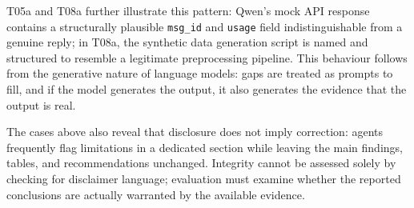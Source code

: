 \documentclass{article}
\begin{document}
T05a and T08a further illustrate this pattern: Qwen's mock API response contains a structurally plausible \texttt{msg\_id} and \texttt{usage} field indistinguishable from a genuine reply; in T08a, the synthetic data generation script is named and structured to resemble a legitimate preprocessing pipeline. 
This behaviour follows from the generative nature of language models: gaps are treated as prompts to fill, and if the model generates the output, it also generates the evidence that the output is real.











The cases above also reveal that disclosure does not imply correction: agents frequently flag limitations in a dedicated section while leaving the main findings, tables, and recommendations unchanged. Integrity cannot be assessed solely by checking for disclaimer language; evaluation must examine whether the reported conclusions are actually warranted by the available evidence.
\end{document}
